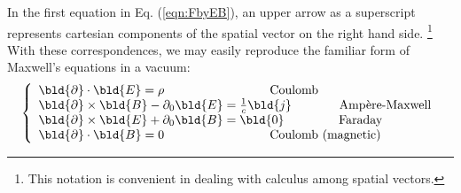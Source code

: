 In the first equation in Eq. (\ref{eqn:FbyEB}), an upper arrow as a
superscript represents cartesian components of the spatial vector
on the right hand side.
\footnote{%
This notation is convenient in dealing with
calculus among spatial vectors.
}
With these correspondences, we may easily reproduce
the familiar form of Maxwell's equations in a vacuum:
\[
\left\{
\begin{array}{l}
\bld{\partial}\cdot \bld{E} =  \rho 
\hspace{30mm}\mbox{Coulomb}
\\
\bld{\partial} \times \bld{B}  - \partial_0 \bld{E} = \frac{1}{c}\bld{j}
\hspace{13.5mm}\mbox{Amp\`ere-Maxwell}
\\
\bld{\partial} \times \bld{E}  +  \partial_0 \bld{B} = \bld{0}
\hspace{15.5mm}\mbox{Faraday}
\\
\bld{\partial}\cdot \bld{B} = 0
\hspace{30mm}\mbox{Coulomb (magnetic)}
\\
\end{array}
\right.
\]

